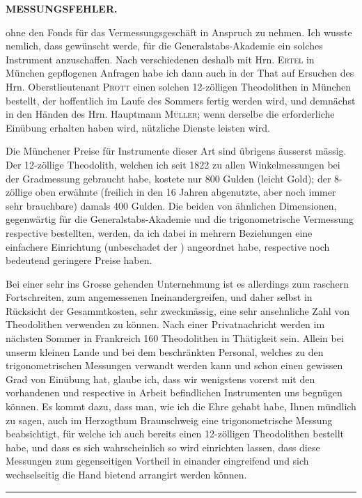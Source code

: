 \par\clearpage
\noindent\null\hfill{\small\textbf{MESSUNGSFEHLER.}}\hfill{}\par\medskip
\noindent ohne den Fonds für das Vermessungsgeschäft in Anspruch zu nehmen. Ich wusste nemlich, dass gewünscht werde, für die Generalstabs-Akademie ein solches Instrument anzuschaffen. Nach verschiedenen deshalb mit Hrn. \textsc{Ertel} in München gepflogenen Anfragen habe ich dann auch in der That auf Ersuchen des Hrn. Oberstlieutenant \textsc{Prott} einen solchen 12-zölligen Theodolithen in München bestellt, der hoffentlich im Laufe des Sommers fertig werden wird, und demnächst in den Händen des Hrn. Hauptmann \textsc{Müller}; wenn derselbe die erforderliche Einübung erhalten haben wird, nützliche Dienste leisten wird.

\par\noindent\hspace*{\parindent}Die Münchener Preise für Instrumente dieser Art sind übrigens äusserst mässig. Der 12-zöllige Theodolith, welchen ich seit 1822 zu allen Winkelmessungen bei der Gradmessung gebraucht habe, kostete nur 800 Gulden (leicht Gold); der 8-zöllige oben erwähnte (freilich in den 16 Jahren  abgenutzte, aber noch immer sehr brauchbare) damals 400 Gulden. Die beiden von ähnlichen Dimensionen, gegenwärtig für die Generalstabs-Akademie und die trigonometrische Vermessung respective bestellten, werden, da ich dabei in mehrern Beziehungen eine einfachere Einrichtung (unbeschadet der ) angeordnet habe, respective noch bedeutend geringere Preise haben.

\par\noindent\hspace*{\parindent}Bei einer sehr ins Grosse gehenden Unternehmung ist es allerdings zum raschern Fortschreiten, zum angemessenen Ineinandergreifen, und daher selbst in Rücksicht der Gesammtkosten, sehr zweckmässig, eine sehr ansehnliche Zahl von Theodolithen verwenden zu können. Nach einer Privatnachricht werden im nächsten Sommer in Frankreich 160 Theodolithen in Thätigkeit sein. Allein bei unserm kleinen Lande und bei dem beschränkten Personal, welches zu den trigonometrischen Messungen verwandt werden kann und schon einen gewissen Grad von Einübung hat, glaube ich, dass wir wenigstens vorerst mit den vorhandenen und respective in Arbeit befindlichen Instrumenten uns begnügen können. Es kommt dazu, dass man, wie ich die Ehre gehabt habe, Ihnen mündlich zu sagen, auch im Herzogthum Braunschweig eine trigonometrische Messung beabsichtigt, für welche ich auch bereits einen 12-zölligen Theodolithen bestellt habe, und dass es sich wahrscheinlich so wird einrichten lassen, dass diese Messungen zum gegenseitigen Vortheil in einander eingreifend und sich wechselseitig die Hand bietend arrangirt werden können.
\begin{center}\rule{3.5cm}{.4pt}\end{center}
\noindent{}\par

